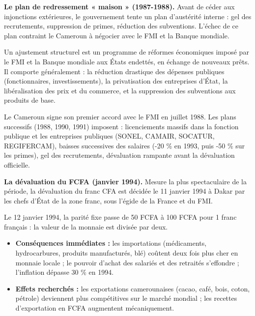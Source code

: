\documentclass[11pt]{article}
\newcommand{\cle}[1]{{\popxbold\color{popdark}#1}}
\begin{document}
\textbf{Le plan de redressement « maison » (1987-1988).} Avant de céder aux injonctions extérieures, le gouvernement tente un plan d'austérité interne : gel des recrutements, suppression de primes, réduction des subventions. L'échec de ce plan contraint le Cameroun à négocier avec le FMI et la Banque mondiale.

\begin{definition}
Un \cle{ajustement structurel} est un programme de réformes économiques imposé par le \cle{FMI} et la \cle{Banque mondiale} aux États endettés, en échange de nouveaux prêts. Il comporte généralement : la réduction drastique des dépenses publiques (fonctionnaires, investissements), la privatisation des entreprises d'État, la libéralisation des prix et du commerce, et la suppression des subventions aux produits de base.
\end{definition}

Le Cameroun signe son premier accord avec le FMI en \cle{juillet 1988}. Les plans successifs (1988, 1990, 1991) imposent : licenciements massifs dans la fonction publique et les entreprises publiques (\cle{SONEL}, \cle{CAMAIR}, \cle{SOCATUR}, \cle{REGIFERCAM}), baisses successives des salaires (\cle{-20 \%} en 1993, puis \cle{-50 \%} sur les primes), gel des recrutements, dévaluation rampante avant la dévaluation officielle.

\textbf{La dévaluation du FCFA (janvier 1994).} Mesure la plus spectaculaire de la période, la dévaluation du franc CFA est décidée le 11 janvier 1994 à Dakar par les chefs d'État de la zone franc, sous l'égide de la France et du FMI.

\begin{exemplebox}
Le 12 janvier 1994, la parité fixe passe de \num{50} FCFA à \num{100} FCFA pour 1 franc français : la valeur de la monnaie est \cle{divisée par deux}.
\begin{itemize}
\item \textbf{Conséquences immédiates :} les importations (médicaments, hydrocarbures, produits manufacturés, blé) coûtent deux fois plus cher en monnaie locale ; le pouvoir d'achat des salariés et des retraités s'effondre ; l'inflation dépasse \num{30} \% en 1994.
\item \textbf{Effets recherchés :} les exportations camerounaises (cacao, café, bois, coton, pétrole) deviennent plus compétitives sur le marché mondial ; les recettes d'exportation en FCFA augmentent mécaniquement.
\end{itemize}
\end{exemplebox}
\end{document}
